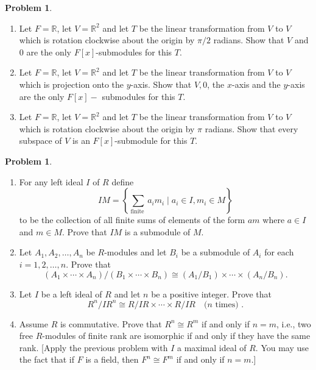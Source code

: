 \documentclass{amsart}
\numberwithin{equation}{section}
\theoremstyle{definition}
\newtheorem{problem}[thm]{Problem}
\begin{document}
\begin{problem}
  \begin{enumerate}
  \item Let \(F=\mathbb{R}\), let \(V=\mathbb{R}^2\) and let \(T\) be the linear transformation from \(V\) to \(V\) which is rotation clockwise about the origin by \(\pi / 2\) radians. Show that \(V\) and 0 are the only \(F[x]\)-submodules for this \(T\).
  \item Let \(F=\mathbb{R}\), let \(V=\mathbb{R}^2\) and let \(T\) be the linear transformation from \(V\) to \(V\) which is projection onto the \(y\)-axis. Show that \(V, 0\), the \(x\)-axis and the \(y\)-axis are the only \(F[x]-\) submodules for this \(T\).
  \item Let \(F=\mathbb{R}\), let \(V=\mathbb{R}^2\) and let \(T\) be the linear transformation from \(V\) to \(V\) which is rotation clockwise about the origin by \(\pi\) radians. Show that every subspace of \(V\) is an
\(F[x]\)-submodule for this \(T\).
  \end{enumerate}
\end{problem}

\begin{problem}
  \begin{enumerate}
    \item For any left ideal \(I\) of \(R\) define
\[
I M=\left\{\sum_{\text {finite }} a_i m_i \mid a_i \in I, m_i \in M\right\}
\]
to be the collection of all finite sums of elements of the form \(a m\) where \(a \in I\) and \(m \in M\). Prove that \(I M\) is a submodule of \(M\).
  \item Let \(A_1, A_2, \ldots, A_n\) be \(R\)-modules and let \(B_i\) be a submodule of \(A_i\) for each \(i=1,2, \ldots, n\). Prove that
\[
\left(A_1 \times \cdots \times A_n\right) /\left(B_1 \times \cdots \times B_n\right) \cong\left(A_1 / B_1\right) \times \cdots \times\left(A_n / B_n\right) .
\]
\item Let \(I\) be a left ideal of \(R\) and let \(n\) be a positive integer. Prove that
\[
R^n / I R^n \cong R / I R \times \cdots \times R / I R \quad(n \text { times) }.
\]
\item   Assume \(R\) is commutative. Prove that \(R^n \cong R^m\) if and
  only if \(n=m\), i.e., two free \(R\)-modules of finite rank are
  isomorphic if and only if they have the same rank. [Apply the
  previous problem with \(I\) a maximal ideal of \(R\). You may use
  the fact that if \(F\) is a field, then \(F^n \cong F^m\) if and
  only if \(n=m\).]
  \end{enumerate}
\end{problem}
\end{document}
